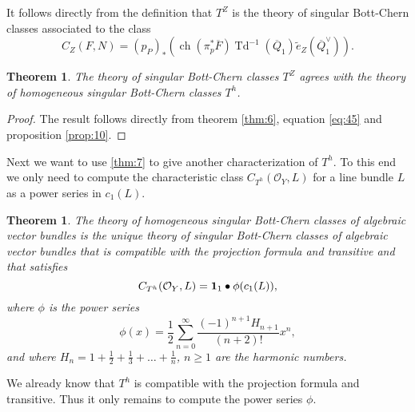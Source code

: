 \documentclass[10pt,twoside]{article}
\numberwithin{equation}{section}
\theoremstyle{plain}
\newtheorem{theorem}[equation]{Theorem}
\theoremstyle{definition}
\DeclareMathOperator{\Td}{Td}
\DeclareMathOperator{\ch}{ch}
\begin{document}
It follows directly from the definition that $T^{Z}$ is the theory
of singular Bott-Chern classes associated to the class
\begin{equation}
  \label{eq:45}
  C_{Z}(F,N)=(p_{P})_{\ast}(\ch(\pi
  _{p}^{\ast}\overline F)\Td^{-1}(\overline Q_{1})\widetilde
  e_{Z}(\overline 
  Q_{1}^{\vee})).
\end{equation}


\begin{theorem}
  The theory of singular Bott-Chern classes $T^{Z}$ agrees with the
  theory of homogeneous singular Bott-Chern classes $T^{h}$.
\end{theorem}
\begin{proof}
  The result follows directly from theorem \ref{thm:6}, equation
  \eqref{eq:45} and proposition \ref{prop:10}.
\end{proof}



Next we want to use \ref{thm:7} to give another characterization of
$T^{h}$. To this end 
we only need to compute the characteristic class
$C_{T^{h}}(\mathcal{O}_{Y},L)$ for a line bundle $L$ as a power
series in $c_{1}(L)$. 

\begin{theorem} \label{thm:11}
  The theory of homogeneous singular Bott-Chern classes of algebraic
  vector bundles is the unique
  theory of singular Bott-Chern classes of algebraic vector bundles that 
  is compatible with the projection formula and transitive and that
  satisfies
  \begin{displaymath}
    C_{T^{h}}(\mathcal{O}_{Y},L)={\bf 1}_{1}\bullet \phi(c_{1}(L)), 
  \end{displaymath}
  where $\phi $ is the power series
  \begin{displaymath}
    \phi(x)=\frac{1}{2}
    \sum_{n=0}^{\infty}\frac{(-1)^{n+1}H_{n+1}}{(n+2)!}x^{n},
  \end{displaymath}
  and where $H_{n}=1+\frac{1}{2}+\frac{1}{3}+\dots +\frac{1}{n}$, $n\ge 1$
  are the harmonic 
 numbers.
\end{theorem}

We already know that
$T^{h}$ is compatible with the projection
formula and transitive. Thus it only remains to compute the power
series $\phi $.
\end{document}
